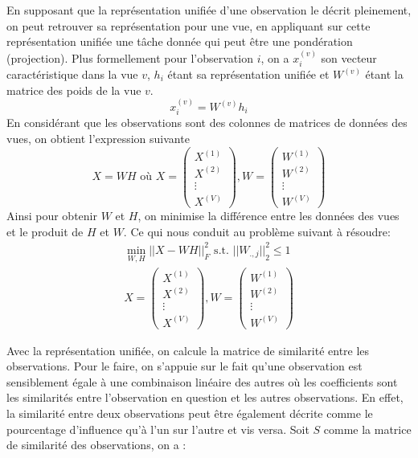    	 En supposant que la représentation unifiée d'une observation le décrit pleinement, on peut retrouver sa représentation pour une vue, en appliquant sur cette représentation unifiée une tâche donnée qui peut être une pondération (projection).
  	  Plus formellement pour l'observation $i$, on a $x_i^{(v)}$ son vecteur caractéristique dans la vue $v$, $h_i$ étant sa représentation unifiée et $W^{(v)}$ étant la matrice des poids de la vue $v$.
  	  \begin{equation*}
			x_i^{(v)} = W^{(v)} h_i
  	  \end{equation*}
  	  En considérant que les observations sont des colonnes de matrices de données des vues, on obtient l'expression suivante
  	  \begin{equation*}
			X = WH \text{ où } X = \begin{pmatrix} X^{(1)}\\X^{(2)}\\\vdots\\X^{(V)} \end{pmatrix}, W = \begin{pmatrix} W^{(1)}\\W^{(2)}\\\vdots\\W^{(V)}\end{pmatrix}
  	  \end{equation*}
  	  Ainsi pour obtenir $W$ et $H$, on minimise la différence entre les données des vues et le produit de $H$ et $W$.
  	  Ce qui nous conduit au problème suivant à résoudre:
  	  \begin{equation}
			\begin{aligned}
				\min_{W,H} {|| X - WH ||}_F^2 \text{  s.t. ${|| W_{.,j} ||}_2^2 \leq 1$} \\
				X = \begin{pmatrix} X^{(1)}\\X^{(2)}\\\vdots\\X^{(V)} \end{pmatrix}, W = \begin{pmatrix} W^{(1)}\\W^{(2)}\\\vdots\\W^{(V)}\end{pmatrix}
			\end{aligned}
			\label{equa:mcles3}
  	  \end{equation}
    
  	  Avec la représentation unifiée, on calcule la matrice de similarité entre les observations.
  	  Pour le faire, on s'appuie sur le fait qu'une observation est sensiblement égale à une combinaison linéaire des autres où les coefficients sont les similarités entre l'observation en question et les autres observations.
  	  En effet, la similarité entre deux observations peut être également décrite comme le pourcentage d'influence qu'à l'un sur l'autre et vis versa.
  	  Soit $S$ comme la matrice de similarité des observations, on a :
      
